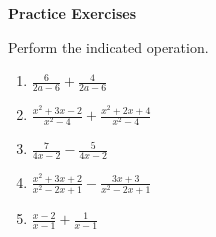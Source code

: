 \textbf{Practice Exercises}

\vspce

Perform the indicated  operation. 
\vspce

\begin{enumerate}[label = \arabic*. ]

\item \hspce $\displaystyle \frac{6}{2a-6} + \frac{4}{2a-6}$ 
\vspce
\item \hspce $\displaystyle \frac{x^{2}+3x-2}{x^{2}-4}+\frac{x^{2}+2x+4}{x^{2}-4}$ 
\vspce
\item \hspce $\displaystyle \frac{7}{4x-2}-\frac{5}{4x-2}$
\vspce
\item \hspce $\displaystyle \frac{x^{2}+3x+2}{x^{2}-2x+1} - \frac{3x+3}{x^{2}-2x+1}$
\vspce
\item \hspce $\displaystyle \frac{x-2}{x-1} + \frac{1}{x-1}$

\end{enumerate}